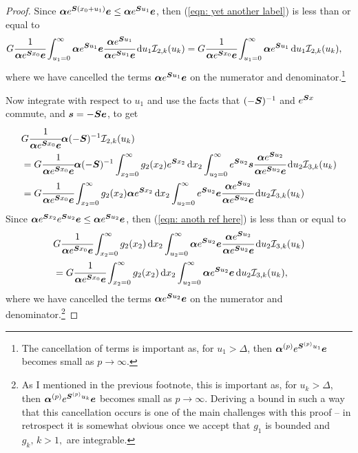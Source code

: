 \begin{proof}
	Since \( \boldsymbol \alpha e^{\boldsymbol{S}(x_0 +u_1)}\boldsymbol e \leq \boldsymbol \alpha e^{\boldsymbol{S}u_1}\boldsymbol e \), then (\ref{eqn: yet another label}) is less than or equal to 
	\begin{align}
		&G  \cfrac{1}{\boldsymbol \alpha e^{\boldsymbol{S}x_0}\boldsymbol e} \int_{u_1=0}^\infty \boldsymbol \alpha e^{\boldsymbol{S}u_1}\boldsymbol e \cfrac{\boldsymbol \alpha e^{\boldsymbol{S}u_1}}{\boldsymbol \alpha e^{\boldsymbol{S}u_1}\boldsymbol e}\, \mathrm{d} u_1 \mathcal I_{2,k}(u_k) \nonumber
		=G  \cfrac{1}{\boldsymbol \alpha e^{\boldsymbol{S} x_0 }\boldsymbol e} \int_{u_1=0}^\infty \boldsymbol \alpha e^{\boldsymbol{S}u_1}\, \mathrm{d} u_1 \mathcal I_{2,k}(u_k), 
	\end{align}
	where we have cancelled the terms \(\boldsymbol \alpha e^{\boldsymbol{S}u_1}\boldsymbol e\) on the numerator and denominator.\footnote{The cancellation of terms is important as, for \(u_1>\Delta\), then \(\boldsymbol \alpha^{(p)} e^{\boldsymbol{S}^{(p)}u_1}\boldsymbol e\) becomes small as \(p\to\infty\).}

	Now integrate with respect to \(u_1\) and use the facts that \((-\boldsymbol{S})^{-1}\) and \(e^{\boldsymbol{S}x}\) commute, and \(\boldsymbol s = - \boldsymbol{S} \boldsymbol e \), to get 
	\begin{align}
		& G  \cfrac{1}{\boldsymbol \alpha e^{\boldsymbol{S}x_0}\boldsymbol e} \boldsymbol \alpha (-\boldsymbol{S})^{-1}  \mathcal I_{2,k}(u_k) \label{eqn: rep from here}
		\\& = G  \cfrac{1}{\boldsymbol \alpha e^{\boldsymbol{S}x_0}\boldsymbol e}  \boldsymbol \alpha (-\boldsymbol{S})^{-1} \int_{x_2=0}^\infty g_2(x_2)  e^{\boldsymbol{S}x_2} \, \mathrm{d} x_2 \int_{u_2=0}^\infty e^{\boldsymbol{S}u_2}\boldsymbol s \cfrac{\boldsymbol \alpha e^{\boldsymbol{S}u_2}}{\boldsymbol \alpha e^{\boldsymbol{S}u_2}\boldsymbol e}\, \mathrm{d} u_2 \mathcal I_{3,k}(u_k)\nonumber 
		\\& = G  \cfrac{1}{\boldsymbol \alpha e^{\boldsymbol{S}x_0}\boldsymbol e}  \int_{x_2=0}^\infty g_2(x_2) \boldsymbol \alpha e^{\boldsymbol{S}x_2} \, \mathrm{d} x_2 \int_{u_2=0} ^\infty e^{\boldsymbol{S}u_2}\boldsymbol e \cfrac{\boldsymbol \alpha e^{\boldsymbol{S}u_2}}{\boldsymbol \alpha e^{\boldsymbol{S}u_2}\boldsymbol e}\, \mathrm{d} u_2 \mathcal I_{3,k}(u_k)\label{eqn: anoth ref here}
	\end{align}
	Since \(\boldsymbol \alpha e^{\boldsymbol{S}x_2}e^{\boldsymbol{S}u_2}\boldsymbol e \leq \boldsymbol \alpha e^{\boldsymbol{S}u_2}\boldsymbol e \), then (\ref{eqn: anoth ref here}) is less than or equal to 
	\begin{align}
		& G  \cfrac{1}{\boldsymbol \alpha e^{\boldsymbol{S}x_0}\boldsymbol e}  \int_{x_2=0}^\infty g_2(x_2) \, \mathrm{d} x_2 \int_{u_2=0}^\infty \boldsymbol \alpha e^{\boldsymbol{S}u_2}\boldsymbol e \cfrac{\boldsymbol \alpha e^{\boldsymbol{S}u_2}}{\boldsymbol \alpha e^{\boldsymbol{S}u_2}\boldsymbol e}\, \mathrm{d} u_2 \mathcal I_{3,k}(u_k) \nonumber
		\\&= G  \cfrac{1}{\boldsymbol \alpha e^{\boldsymbol{S}x_0}\boldsymbol e}  \int_{x_2=0}^\infty g_2(x_2) \, \mathrm{d} x_2 \int_{u_2=0}^\infty \boldsymbol \alpha e^{\boldsymbol{S}u_2}\boldsymbol e\, \mathrm{d} u_2 \mathcal I_{3,k}(u_k), \label{eqn: allalalalalalal}
	\end{align}
	where we have cancelled the terms \(\boldsymbol \alpha e^{\boldsymbol{S}u_2}\boldsymbol e\) on the numerator and denominator.\footnote{As I mentioned in the previous footnote, this is important as, for \(u_k>\Delta\), then \(\boldsymbol \alpha^{(p)} e^{\boldsymbol{S}^{(p)}u_k}\boldsymbol e\) becomes small as \(p\to\infty\). Deriving a bound in such a way that this cancellation occurs is one of the main challenges with this proof -- in retrospect it is somewhat obvious once we accept that \(g_1\) is bounded and \(g_k,\,k>1,\) are integrable.}


\end{proof}
